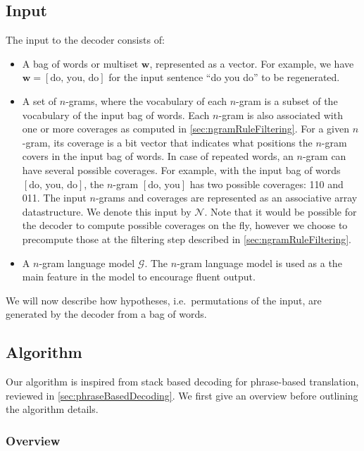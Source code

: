\subsection{Input}

The input to the decoder consists of:
%
\begin{itemize}
  \item A bag of words or multiset $\bm{w}$, represented as a vector.
    For example, we have $\bm{w} = [\text{do, you, do}]$ for the
    input sentence ``do you do'' to be regenerated.
  \item A set of $n$-grams, where the
    vocabulary of each $n$-gram is a subset of the vocabulary of the
    input bag of words. Each $n$-gram is also associated with
    one or more coverages as computed in \autoref{sec:ngramRuleFiltering}.
    For a given $n$-gram, its coverage is a bit vector
    that indicates what positions the $n$-gram covers in the input bag of words.
    In case of repeated words, an $n$-gram can have several possible
    coverages. For example, with the input bag of words
    $[\text{do, you, do}]$, the $n$-gram $[\text{do, you}]$ has
    two possible coverages: 110 and 011.
    The input $n$-grams and coverages are represented as
    an associative array datastructure. We denote this
    input by $\mathcal{N}$. Note that it would be possible for the decoder
    to compute possible coverages on the fly, however we choose to precompute those
    at the filtering step described in \autoref{sec:ngramRuleFiltering}.
  \item A $n$-gram language model $\mathcal{G}$. The $n$-gram
    language model is used as a the main feature in the model to
    encourage fluent output.
\end{itemize}
%
We will now describe how hypotheses, i.e.\ permutations of the
input, are generated by the decoder from a bag of words.

\subsection{Algorithm}

Our algorithm is inspired from stack based decoding for phrase-based
translation, reviewed in \autoref{sec:phraseBasedDecoding}. We
first give an overview
before outlining the algorithm details.

\subsubsection{Overview}
\label{sec:gyroAlgorithmOverview}

